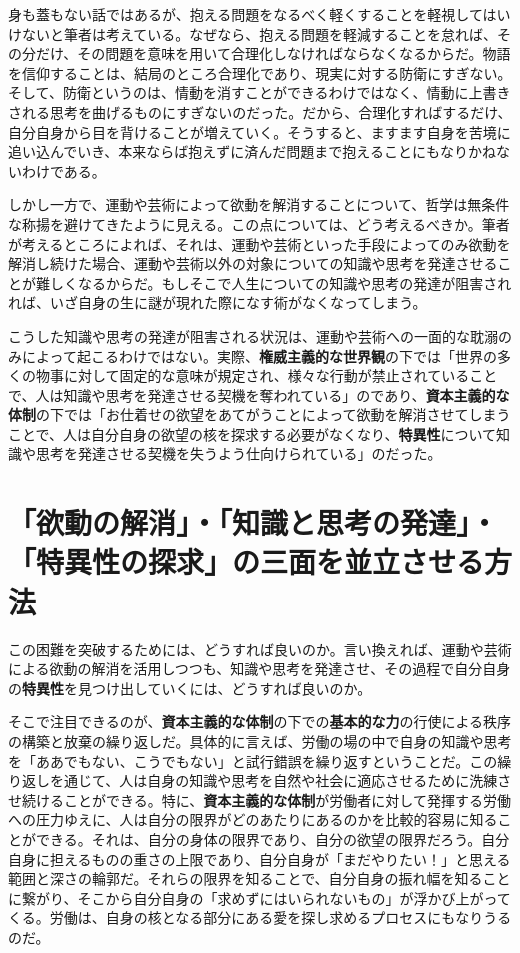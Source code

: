 \documentclass[8pt, a5paper]{ltjsarticle}
\begin{document}
身も蓋もない話ではあるが、抱える問題をなるべく軽くすることを軽視してはいけないと筆者は考えている。なぜなら、抱える問題を軽減することを怠れば、その分だけ、その問題を意味を用いて合理化しなければならなくなるからだ。物語を信仰することは、結局のところ合理化であり、現実に対する防衛にすぎない。そして、防衛というのは、情動を消すことができるわけではなく、情動に上書きされる思考を曲げるものにすぎないのだった。だから、合理化すればするだけ、自分自身から目を背けることが増えていく。そうすると、ますます自身を苦境に追い込んでいき、本来ならば抱えずに済んだ問題まで抱えることにもなりかねないわけである。

しかし一方で、運動や芸術によって欲動を解消することについて、哲学は無条件な称揚を避けてきたように見える。この点については、どう考えるべきか。筆者が考えるところによれば、それは、運動や芸術といった手段によってのみ欲動を解消し続けた場合、運動や芸術以外の対象についての知識や思考を発達させることが難しくなるからだ。もしそこで人生についての知識や思考の発達が阻害されれば、いざ自身の生に謎が現れた際になす術がなくなってしまう。

こうした知識や思考の発達が阻害される状況は、運動や芸術への一面的な耽溺のみによって起こるわけではない。実際、\textbf{権威主義的な世界観}の下では「世界の多くの物事に対して固定的な意味が規定され、様々な行動が禁止されていることで、人は知識や思考を発達させる契機を奪われている」のであり、\textbf{資本主義的な体制}の下では「お仕着せの欲望をあてがうことによって欲動を解消させてしまうことで、人は自分自身の欲望の核を探求する必要がなくなり、\textbf{特異性}について知識や思考を発達させる契機を失うよう仕向けられている」のだった。

\section{「欲動の解消」・「知識と思考の発達」・「特異性の探求」の三面を並立させる方法}\label{ux6b32ux52d5ux306eux89e3ux6d88ux77e5ux8b58ux3068ux601dux8003ux306eux767aux9054ux7279ux7570ux6027ux306eux63a2ux6c42ux306eux4e09ux9762ux3092ux4e26ux7acbux3055ux305bux308bux65b9ux6cd5}

この困難を突破するためには、どうすれば良いのか。言い換えれば、運動や芸術による欲動の解消を活用しつつも、知識や思考を発達させ、その過程で自分自身の\textbf{特異性}を見つけ出していくには、どうすれば良いのか。

そこで注目できるのが、\textbf{資本主義的な体制}の下での\textbf{基本的な力}の行使による秩序の構築と放棄の繰り返しだ。具体的に言えば、労働の場の中で自身の知識や思考を「ああでもない、こうでもない」と試行錯誤を繰り返すということだ。この繰り返しを通じて、人は自身の知識や思考を自然や社会に適応させるために洗練させ続けることができる。特に、\textbf{資本主義的な体制}が労働者に対して発揮する労働への圧力ゆえに、人は自分の限界がどのあたりにあるのかを比較的容易に知ることができる。それは、自分の身体の限界であり、自分の欲望の限界だろう。自分自身に担えるものの重さの上限であり、自分自身が「まだやりたい！」と思える範囲と深さの輪郭だ。それらの限界を知ることで、自分自身の振れ幅を知ることに繋がり、そこから自分自身の「求めずにはいられないもの」が浮かび上がってくる。労働は、自身の核となる部分にある愛を探し求めるプロセスにもなりうるのだ。
\end{document}
